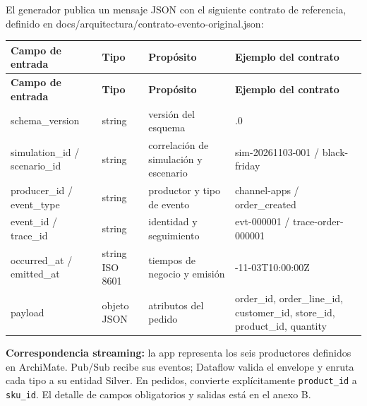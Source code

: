 \documentclass[11pt]{article}
\begin{document}
El generador publica un mensaje JSON con el siguiente contrato de referencia, definido en docs/\allowbreak{}arquitectura/\allowbreak{}contrato-evento-original.json:\par

\begingroup\small
\begin{longtable}{@{}>{\raggedright\arraybackslash}p{}>{\raggedright\arraybackslash}p{}>{\raggedright\arraybackslash}p{}>{\raggedright\arraybackslash}p{}@{}}
\toprule
\textbf{Campo de entrada} & \textbf{Tipo} & \textbf{Propósito} & \textbf{Ejemplo del contrato} \\
\midrule
\endfirsthead
\toprule
\textbf{Campo de entrada} & \textbf{Tipo} & \textbf{Propósito} & \textbf{Ejemplo del contrato} \\
\midrule
\endhead
schema\_\allowbreak{}version & string & versión del esquema & 1.1.0 \\
simulation\_\allowbreak{}id / scenario\_\allowbreak{}id & string & correlación de simulación y escenario & sim-20261103-001 / black-friday \\
producer\_\allowbreak{}id / event\_\allowbreak{}type & string & productor y tipo de evento & channel-apps / order\_\allowbreak{}created \\
event\_\allowbreak{}id / trace\_\allowbreak{}id & string & identidad y seguimiento & evt-000001 / trace-order-000001 \\
occurred\_\allowbreak{}at / emitted\_\allowbreak{}at & string ISO 8601 & tiempos de negocio y emisión & 2026-11-03T10:00:00Z \\
payload & objeto JSON & atributos del pedido & order\_\allowbreak{}id, order\_\allowbreak{}line\_\allowbreak{}id, customer\_\allowbreak{}id, store\_\allowbreak{}id, product\_\allowbreak{}id, quantity \\
\bottomrule
\end{longtable}
\endgroup

\textbf{Correspondencia streaming:} la app representa los seis productores definidos en ArchiMate. Pub/Sub recibe sus eventos; Dataflow valida el envelope y enruta cada tipo a su entidad Silver. En pedidos, convierte explícitamente \texttt{product\_id} a \texttt{sku\_id}. El detalle de campos obligatorios y salidas está en el anexo B.\par
\end{document}
